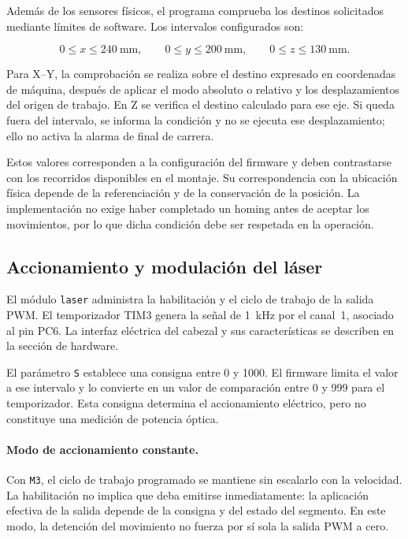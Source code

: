 \documentclass[blue,fullpaper]{ludusofficial}  %
\begin{document}
Además de los sensores físicos, el programa comprueba
los destinos solicitados mediante límites de software.
Los intervalos configurados son:

\begin{equation}
    0 \leq x \leq 240~\mathrm{mm},\qquad
    0 \leq y \leq 200~\mathrm{mm},\qquad
    0 \leq z \leq 130~\mathrm{mm}.
\end{equation}

Para X--Y, la comprobación se realiza sobre el destino
expresado en coordenadas de máquina, después de aplicar
el modo absoluto o relativo y los desplazamientos
del origen de trabajo. En Z se verifica el destino
calculado para ese eje. Si queda fuera del intervalo,
se informa la condición y no se ejecuta ese desplazamiento;
ello no activa la alarma de final de carrera.

Estos valores corresponden a la configuración del
firmware y deben contrastarse con los recorridos
disponibles en el montaje. Su correspondencia con
la ubicación física depende de la referenciación
y de la conservación de la posición. La implementación
no exige haber completado un homing antes de aceptar
los movimientos, por lo que dicha condición debe
ser respetada en la operación.

\subsection{Accionamiento y modulación del láser}

El módulo \texttt{laser} administra la habilitación
y el ciclo de trabajo de la salida PWM. El temporizador
TIM3 genera la señal de 1~kHz por el canal~1, asociado
al pin PC6. La interfaz eléctrica del cabezal y sus
características se describen en la sección de hardware.

El parámetro \texttt{S} establece una consigna entre
0 y 1000. El firmware limita el valor a ese intervalo
y lo convierte en un valor de comparación entre
0 y 999 para el temporizador. Esta consigna determina
el accionamiento eléctrico, pero no constituye una
medición de potencia óptica.

\paragraph{Modo de accionamiento constante.}
Con \texttt{M3}, el ciclo de trabajo programado
se mantiene sin escalarlo con la velocidad.
La habilitación no implica que deba emitirse
inmediatamente: la aplicación efectiva de la salida
depende de la consigna y del estado del segmento.
En este modo, la detención del movimiento no fuerza
por sí sola la salida PWM a cero.
\end{document}
